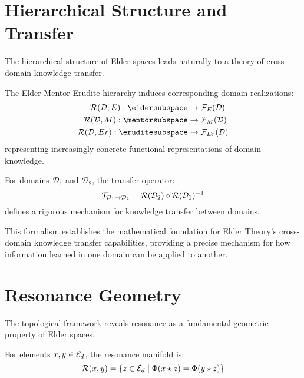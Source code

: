 \section{Hierarchical Structure and Transfer}

The hierarchical structure of Elder spaces leads naturally to a theory of cross-domain knowledge transfer.

\begin{theorem}
The Elder-Mentor-Erudite hierarchy induces corresponding domain realizations:
\begin{align}
\realization{\mathcal{D},E}: \eldersubspace &\rightarrow \mathcal{F}_E(\mathcal{D}) \\
\realization{\mathcal{D},M}: \mentorsubspace &\rightarrow \mathcal{F}_M(\mathcal{D}) \\
\realization{\mathcal{D},Er}: \eruditesubspace &\rightarrow \mathcal{F}_{Er}(\mathcal{D})
\end{align}
representing increasingly concrete functional representations of domain knowledge.
\end{theorem}

\begin{corollary}
For domains $\mathcal{D}_1$ and $\mathcal{D}_2$, the transfer operator:
\begin{equation}
\mathcal{T}_{\mathcal{D}_1 \rightarrow \mathcal{D}_2} = \mathcal{R}(\mathcal{D}_2) \circ \mathcal{R}(\mathcal{D}_1)^{-1}
\end{equation}
defines a rigorous mechanism for knowledge transfer between domains.
\end{corollary}

This formalism establishes the mathematical foundation for Elder Theory's cross-domain knowledge transfer capabilities, providing a precise mechanism for how information learned in one domain can be applied to another.

\section{Resonance Geometry}

The topological framework reveals resonance as a fundamental geometric property of Elder spaces.

\begin{definition}
For elements $x, y \in \mathcal{E}_{d}$, the resonance manifold is:
\begin{equation}
\mathcal{R}(x, y) = \{z \in \mathcal{E}_{d} \mid \Phi(x \star z) = \Phi(y \star z)\}
\end{equation}
\end{definition}

